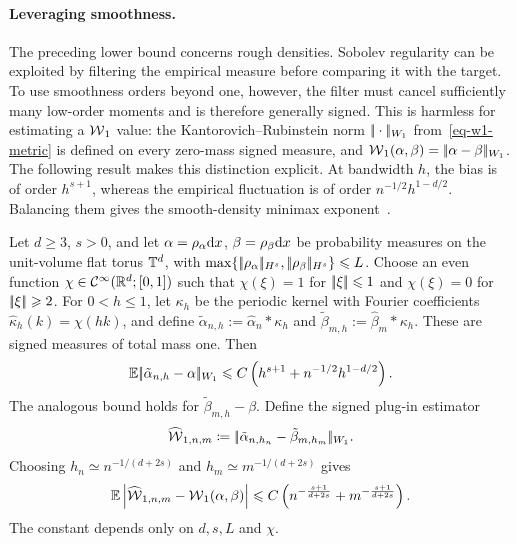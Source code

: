 \paragraph{Leveraging smoothness.}
The preceding lower bound concerns rough densities. Sobolev regularity can be exploited by filtering the empirical measure before comparing it with the target. To use smoothness orders beyond one, however, the filter must cancel sufficiently many low-order moments and is therefore generally signed. This is harmless for estimating a \(\operatorname{\mathcal{W}}_1\) value: the Kantorovich--Rubinstein norm \(|\!| \cdot |\!|_{W_1}\) from~\eqref{eq-w1-metric} is defined on every zero-mass signed measure, and \(\operatorname{\mathcal{W}}_1(\alpha,\beta)=|\!| \alpha-\beta |\!|_{W_1}\). The following result makes this distinction explicit. At bandwidth \(h\), the bias is of order \(h^{s+1}\), whereas the empirical fluctuation is of order \(n^{-1/2}h^{1-d/2}\). Balancing them gives the smooth-density minimax exponent~\cite{nilesweed2019minimaxSmooth,divol2022measure}.

\begin{prop}\label{prop-smooth-plugin-w1-rate}
	Let \(d\geq3\), \(s>0\), and let \(\alpha=\rho_{\alpha}\mathrm{d} x\), \(\beta=\rho_{\beta}\mathrm{d} x\) be probability measures on the unit-volume flat torus \(\mathbb{T}^d\), with \(\max\{|\!| \rho_{\alpha} |\!|_{H^s},|\!| \rho_{\beta} |\!|_{H^s}\}\leqslant L\). Choose an even function \(\chi\in\mathcal{C}^\infty(\mathbb{R}^d;[0,1])\) such that \(\chi(\xi)=1\) for \(|\!| \xi |\!|\leqslant1\) and \(\chi(\xi)=0\) for \(|\!| \xi |\!|\geqslant2\). For \(0<h\leq1\), let \(\kappa_h\) be the periodic kernel with Fourier coefficients \(\widehat\kappa_h(k)=\chi(hk)\), and define \(\tilde\alpha_{n,h}:=\hat\alpha_n\ast\kappa_h\) and \(\tilde\beta_{m,h}:=\hat\beta_m\ast\kappa_h\). These are signed measures of total mass one. Then
	\[
		\mathbb{E}|\!| \tilde\alpha_{n,h}-\alpha |\!|_{W_1}
		\leqslant
		C\left(h^{s+1}+n^{-1/2}h^{1-d/2}\right).
	\]
	The analogous bound holds for \(\tilde\beta_{m,h}-\beta\). Define the signed plug-in estimator
	\[
		\widehat{\operatorname{\mathcal{W}}}_{1,n,m}
		\coloneqq
		|\!| \tilde\alpha_{n,h_n}-\tilde\beta_{m,h_m} |\!|_{W_1}.
	\]
	Choosing \(h_n\simeq n^{-1/(d+2s)}\) and \(h_m\simeq m^{-1/(d+2s)}\) gives
	\[
		\mathbb{E}\left\lvert
			\widehat{\operatorname{\mathcal{W}}}_{1,n,m}
			-
			\operatorname{\mathcal{W}}_1(\alpha,\beta)\right\rvert
		\leqslant
		C\left(n^{-\frac{s+1}{d+2s}}+m^{-\frac{s+1}{d+2s}}\right).
	\]
	The constant depends only on \(d,s,L\) and \(\chi\).
\end{prop}

